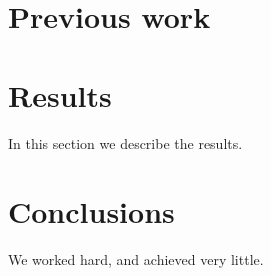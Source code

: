 \documentclass[12pt]{article}
\begin{document}
\section{Previous work}\label{previous work}

\section{Results}\label{results}
In this section we describe the results.

\section{Conclusions}\label{conclusions}
We worked hard, and achieved very little.



\end{document}
